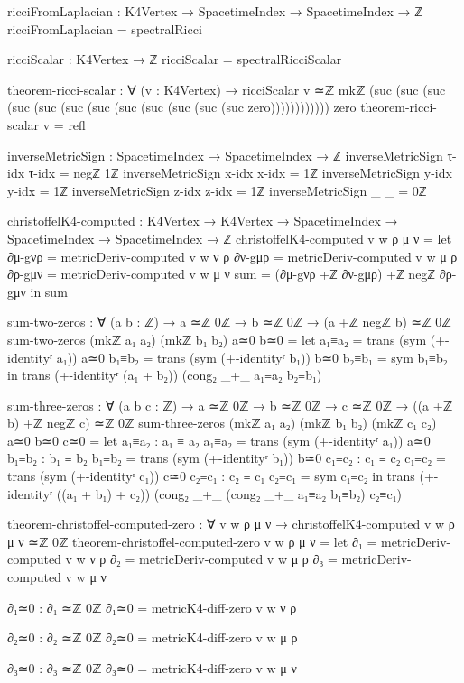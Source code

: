 \documentclass[11pt,a4paper]{book}
\begin{document}
\begin{code}
ricciFromLaplacian : K4Vertex → SpacetimeIndex → SpacetimeIndex → ℤ
ricciFromLaplacian = spectralRicci

ricciScalar : K4Vertex → ℤ
ricciScalar = spectralRicciScalar

theorem-ricci-scalar : ∀ (v : K4Vertex) → 
  ricciScalar v ≃ℤ mkℤ (suc (suc (suc (suc (suc (suc (suc (suc (suc (suc (suc (suc zero)))))))))))) zero
theorem-ricci-scalar v = refl

inverseMetricSign : SpacetimeIndex → SpacetimeIndex → ℤ
inverseMetricSign τ-idx τ-idx = negℤ 1ℤ
inverseMetricSign x-idx x-idx = 1ℤ
inverseMetricSign y-idx y-idx = 1ℤ
inverseMetricSign z-idx z-idx = 1ℤ
inverseMetricSign _     _     = 0ℤ

christoffelK4-computed : K4Vertex → K4Vertex → SpacetimeIndex → SpacetimeIndex → SpacetimeIndex → ℤ
christoffelK4-computed v w ρ μ ν = 
  let
      ∂μ-gνρ = metricDeriv-computed v w ν ρ
      ∂ν-gμρ = metricDeriv-computed v w μ ρ
      ∂ρ-gμν = metricDeriv-computed v w μ ν
      sum = (∂μ-gνρ +ℤ ∂ν-gμρ) +ℤ negℤ ∂ρ-gμν
  in sum

sum-two-zeros : ∀ (a b : ℤ) → a ≃ℤ 0ℤ → b ≃ℤ 0ℤ → (a +ℤ negℤ b) ≃ℤ 0ℤ
sum-two-zeros (mkℤ a₁ a₂) (mkℤ b₁ b₂) a≃0 b≃0 = 
  let a₁≡a₂ = trans (sym (+-identityʳ a₁)) a≃0
      b₁≡b₂ = trans (sym (+-identityʳ b₁)) b≃0
      b₂≡b₁ = sym b₁≡b₂
  in trans (+-identityʳ (a₁ + b₂)) (cong₂ _+_ a₁≡a₂ b₂≡b₁)

sum-three-zeros : ∀ (a b c : ℤ) → a ≃ℤ 0ℤ → b ≃ℤ 0ℤ → c ≃ℤ 0ℤ → 
                  ((a +ℤ b) +ℤ negℤ c) ≃ℤ 0ℤ
sum-three-zeros (mkℤ a₁ a₂) (mkℤ b₁ b₂) (mkℤ c₁ c₂) a≃0 b≃0 c≃0 = 
  let a₁≡a₂ : a₁ ≡ a₂
      a₁≡a₂ = trans (sym (+-identityʳ a₁)) a≃0
      b₁≡b₂ : b₁ ≡ b₂
      b₁≡b₂ = trans (sym (+-identityʳ b₁)) b≃0
      c₁≡c₂ : c₁ ≡ c₂
      c₁≡c₂ = trans (sym (+-identityʳ c₁)) c≃0
      c₂≡c₁ : c₂ ≡ c₁
      c₂≡c₁ = sym c₁≡c₂
  in trans (+-identityʳ ((a₁ + b₁) + c₂))
           (cong₂ _+_ (cong₂ _+_ a₁≡a₂ b₁≡b₂) c₂≡c₁)

theorem-christoffel-computed-zero : ∀ v w ρ μ ν → christoffelK4-computed v w ρ μ ν ≃ℤ 0ℤ
theorem-christoffel-computed-zero v w ρ μ ν = 
  let ∂₁ = metricDeriv-computed v w ν ρ
      ∂₂ = metricDeriv-computed v w μ ρ
      ∂₃ = metricDeriv-computed v w μ ν
      
      ∂₁≃0 : ∂₁ ≃ℤ 0ℤ
      ∂₁≃0 = metricK4-diff-zero v w ν ρ
      
      ∂₂≃0 : ∂₂ ≃ℤ 0ℤ
      ∂₂≃0 = metricK4-diff-zero v w μ ρ
      
      ∂₃≃0 : ∂₃ ≃ℤ 0ℤ
      ∂₃≃0 = metricK4-diff-zero v w μ ν
      

\end{code}
\end{document}
